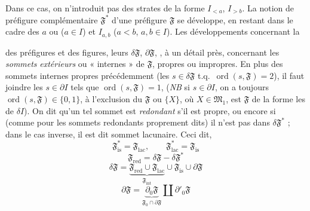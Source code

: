 \documentclass[11pt,a4paper]{article}
\begin{document}
Dans ce cas, on n'introduit pas des strates de la forme $I_{<a}$, $I_{>b}$. La notion de préfigure complémentaire $\mathfrak{F}^{*}$ d'une préfigure $\mathfrak{F}$ se développe, en restant dans le cadre des $a$ ou  ($a \in I$) et $I_{a,b}$ ($a < b$, $a, b \in I$). Les développements concernant la 


des préfigures et des figures, leurs $\delta\mathfrak{F}$, $\partial\mathfrak{F}$, , à un détail près, concernant  les \emph{sommets} \emph{extérieurs}  ou « internes » de $\mathfrak{F}$, propres ou impropres. En plus des sommets internes propres précédemment  (les $s \in \delta\mathfrak{F}$ t.q.\ $\operatorname{ord}(s, \mathfrak{F}) = 2$),  il faut joindre les  $s \in \partial I$ tels que $\operatorname{ord}(s, \mathfrak{F}) = 1$, (\emph{NB} si $s \in \partial I$, on a toujours $\operatorname{ord}(s, \mathfrak{F}) \in \{0, 1\}$, à l'exclusion du     \uncertain{\ill{}}  \uncertain{\ill{}} $\mathfrak{F}$ ou  $\{X\}$, où $X \in \mathfrak{M}_1$, est  \uncertain{\ill{}} \uncertain{\ill{}} $\mathfrak{F}$ de la forme \ill{} \uncertain{\ill{}} les \uncertain{\ill{}} de $\delta I$). On dit qu'un tel sommet est \struck{\ill{}} \emph{redondant} s'il est propre, ou encore si (comme pour les sommets redondants proprement dits) il n'est pas dans $\delta\mathfrak{F}^{*}$ ; dans le cas inverse, il est dit sommet lacunaire. Ceci dit, 
\[
  \mathfrak{F}^{*}_{\mathrm{is}} = \mathfrak{F}_{\mathrm{lac}} , \qquad \mathfrak{F}^{*}_{\mathrm{lac}} = \mathfrak{F}_{\mathrm{is}}
\]
\[
  \mathfrak{F}_{\mathrm{red}} = \delta\mathfrak{F} - \delta\mathfrak{F}^{*}
\]
\[
  \delta\mathfrak{F} = \underbrace{\mathfrak{F}_{\mathrm{red}} \cup \mathfrak{F}_{\mathrm{lac}}}_{\mathfrak{F}_{\mathrm{int}}}
  \cup \mathfrak{F}_{\mathrm{is}} \cup \partial\mathfrak{F}
\]
\[
  \partial\mathfrak{F} = \underbrace{\partial_0\mathfrak{F}}_{\mathfrak{F}_0 \cap \partial\mathfrak{F}} \amalg \partial'_0\mathfrak{F}
\]
\end{document}
